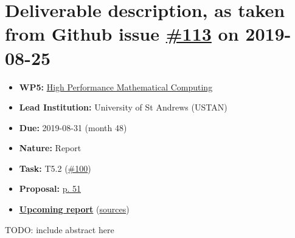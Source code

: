 \hypertarget{deliverable-description-as-taken-from-github-issue-113-on-2019-08-25}{%
\section*{\texorpdfstring{Deliverable description, as taken from Github
issue
\href{https://github.com/OpenDreamKit/OpenDreamKit/issues/113}{\#113} on
2019-08-25}{Deliverable description, as taken from Github issue \#113 on 2019-08-25}}\label{deliverable-description-as-taken-from-github-issue-113-on-2019-08-25}}

\begin{itemize}
\tightlist
\item
  \textbf{WP5:}
  \href{https://github.com/OpenDreamKit/OpenDreamKit/tree/master/WP5}{High
  Performance Mathematical Computing}
\item
  \textbf{Lead Institution:} University of St Andrews (USTAN)
\item
  \textbf{Due:} 2019-08-31 (month 48)
\item
  \textbf{Nature:} Report
\item
  \textbf{Task:} T5.2
  (\href{https://github.com/OpenDreamKit/OpenDreamKit/issues/100}{\#100})
\item
  \textbf{Proposal:}
  \href{https://github.com/OpenDreamKit/OpenDreamKit/raw/master/Proposal/proposal-www.pdf}{p.
  51}
\item
  \textbf{\href{https://github.com/OpenDreamKit/OpenDreamKit/raw/master/WP5/D5.15/report-final.pdf}{Upcoming
  report}}
  (\href{https://github.com/OpenDreamKit/OpenDreamKit/raw/master/WP5/D5.15/}{sources})
\end{itemize}

TODO: include abstract here

